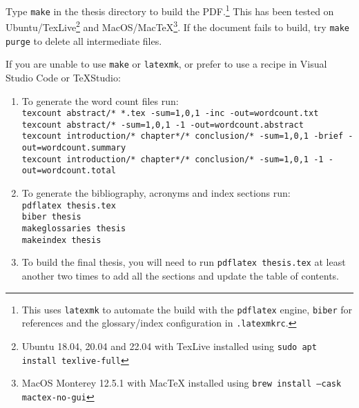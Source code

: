 Type \texttt{make} in the thesis directory to build the PDF.\footnote{This uses \texttt{latexmk}
to automate the build with the \texttt{pdflatex} engine, \texttt{biber} for references and
the glossary/index configuration in \texttt{.latexmkrc}.} This has been tested on
Ubuntu/TexLive\footnote{Ubuntu 18.04, 20.04 and 22.04 with TexLive installed using \texttt{sudo apt install texlive-full}}
and MacOS/MacTeX\footnote{MacOS Monterey 12.5.1 with MacTeX installed using \texttt{brew install --cask mactex-no-gui}}.
If the document fails to build, try \texttt{make purge} to delete all intermediate files.

If you are unable to use \texttt{make} or \texttt{latexmk}, or prefer to use a recipe in
Visual Studio Code or TeXStudio:
\begin{enumerate}
  \item To generate the word count files run:\vspace{1ex}\\
    \texttt{\small texcount abstract/* *.tex -sum=1,0,1 -inc -out=wordcount.txt\\
    texcount abstract/* -sum=1,0,1 -1 -out=wordcount.abstract\\
    texcount introduction/* chapter*/* conclusion/* -sum=1,0,1 -brief -out=wordcount.summary\\
    texcount introduction/* chapter*/* conclusion/* -sum=1,0,1 -1 -out=wordcount.total}\\
  \item To generate the bibliography, acronyms and index sections run:\vspace{1ex}\\
    \texttt{\small pdflatex thesis.tex\\
    biber thesis\\
    makeglossaries thesis\\
    makeindex thesis}
  \item To build the final thesis, you will need to run \texttt{pdflatex thesis.tex} at least
    another two times to add all the sections and update the table of contents.
\end{enumerate}
